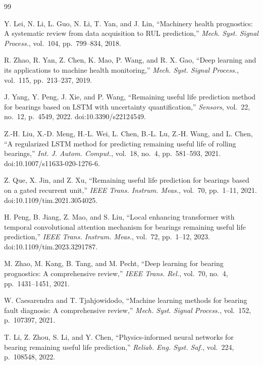 \documentclass[pdflatex,sn-mathphys-num]{sn-jnl}
\begin{document}
\begin{thebibliography}{99}

Y. Lei, N. Li, L. Guo, N. Li, T. Yan, and J. Lin,
``Machinery health prognostics: A systematic review from data acquisition to RUL prediction,''
\textit{Mech. Syst. Signal Process.}, vol.~104, pp.~799--834, 2018.

R. Zhao, R. Yan, Z. Chen, K. Mao, P. Wang, and R. X. Gao,
``Deep learning and its applications to machine health monitoring,''
\textit{Mech. Syst. Signal Process.}, vol.~115, pp.~213--237, 2019.

J. Yang, Y. Peng, J. Xie, and P. Wang,
``Remaining useful life prediction method for bearings based on LSTM with uncertainty quantification,''
\textit{Sensors}, vol.~22, no.~12, p.~4549, 2022. doi:10.3390/s22124549.

Z.-H. Liu, X.-D. Meng, H.-L. Wei, L. Chen, B.-L. Lu, Z.-H. Wang, and L. Chen,
``A regularized LSTM method for predicting remaining useful life of rolling bearings,''
\textit{Int. J. Autom. Comput.}, vol.~18, no.~4, pp.~581--593, 2021. doi:10.1007/s11633-020-1276-6.

Z. Que, X. Jin, and Z. Xu,
``Remaining useful life prediction for bearings based on a gated recurrent unit,''
\textit{IEEE Trans. Instrum. Meas.}, vol.~70, pp.~1--11, 2021. doi:10.1109/tim.2021.3054025.

H. Peng, B. Jiang, Z. Mao, and S. Liu,
``Local enhancing transformer with temporal convolutional attention mechanism for bearings remaining useful life prediction,''
\textit{IEEE Trans. Instrum. Meas.}, vol.~72, pp.~1--12, 2023. doi:10.1109/tim.2023.3291787.

M. Zhao, M. Kang, B. Tang, and M. Pecht,
``Deep learning for bearing prognostics: A comprehensive review,''
\textit{IEEE Trans. Rel.}, vol.~70, no.~4, pp.~1431--1451, 2021.

W. Caesarendra and T. Tjahjowidodo,
``Machine learning methods for bearing fault diagnosis: A comprehensive review,''
\textit{Mech. Syst. Signal Process.}, vol.~152, p.~107397, 2021.

T. Li, Z. Zhou, S. Li, and Y. Chen,
``Physics-informed neural networks for bearing remaining useful life prediction,''
\textit{Reliab. Eng. Syst. Saf.}, vol.~224, p.~108548, 2022.


\end{thebibliography}
\end{document}
